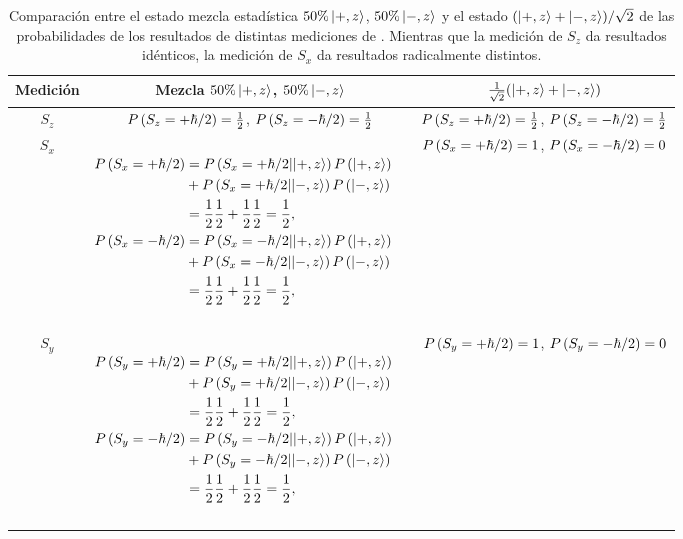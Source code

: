 \documentclass[10pt, a4paper]{article}
\numberwithin{equation}{subsection}
\begin{document}
\begin{table}[ht]
  {\renewcommand{\arraystretch}{2}%
  \begin{tabular}{| c | c | c |}
    \hline
    Medición & Mezcla $50\%\ket{+,z}$, $50\%\ket{-,z}$ &
    $\frac{1}{\sqrt{2}}(\ket{+,z} + \ket{-,z})$ \\
    \hline
    $S_z$ & $P\left({S_z=+\hbar/2}\right) = \frac{1}{2}$, $P\left({S_z=-\hbar/2}\right) =
    \frac{1}{2}$ & $P\left({S_z=+\hbar/2}\right) = \frac{1}{2}$, $P\left({S_z=-\hbar/2}\right) =
    \frac{1}{2}$ \\
    \hline
    $S_x$ & {$\begin{aligned}\;\\ P\left({S_x=+\hbar/2}\right) &=
      P\left({S_x=+\hbar/2}\middle|{\ket{+,z}}\right)P\left({\ket{+,z}}\right) \\ &+
      P\left({S_x=+\hbar/2}\middle|{\ket{-,z}}\right)P\left({\ket{-,z}}\right) \\ &=
      \frac{1}{2}\frac{1}{2} + \frac{1}{2}\frac{1}{2} = \frac{1}{2}, \\
      P\left({S_x=-\hbar/2}\right) &= P\left({S_x=-\hbar/2}\middle|{\ket{+,z}}\right)P\left({\ket{+,z}}\right)
      \\ &+ P\left({S_x=-\hbar/2}\middle|{\ket{-,z}}\right)P\left({\ket{-,z}}\right) \\ &=
      \frac{1}{2}\frac{1}{2} + \frac{1}{2}\frac{1}{2} = \frac{1}{2}, \\ \;
    \end{aligned}$} &
    $P\left({S_x=+\hbar/2}\right) = 1$, $P\left({S_x=-\hbar/2}\right) = 0$ \\
    \hline
    $S_y$ & {$\begin{aligned}\;\\ P\left({S_y=+\hbar/2}\right) &=
      P\left({S_y=+\hbar/2}\middle|{\ket{+,z}}\right)P\left({\ket{+,z}}\right) \\ &+
      P\left({S_y=+\hbar/2}\middle|{\ket{-,z}}\right)P\left({\ket{-,z}}\right) \\ &=
      \frac{1}{2}\frac{1}{2} + \frac{1}{2}\frac{1}{2} = \frac{1}{2}, \\
      P\left({S_y=-\hbar/2}\right) &= P\left({S_y=-\hbar/2}\middle|{\ket{+,z}}\right)P\left({\ket{+,z}}\right)
      \\ &+ P\left({S_y=-\hbar/2}\middle|{\ket{-,z}}\right)P\left({\ket{-,z}}\right) \\
      &= \frac{1}{2}\frac{1}{2} + \frac{1}{2}\frac{1}{2} = \frac{1}{2}, \\ \;
    \end{aligned}$} &
    $P\left({S_y=+\hbar/2}\right) = 1$, $P\left({S_y=-\hbar/2}\right) = 0$ \\
    \hline
  \end{tabular}}
  \caption{Comparación entre el estado mezcla estadística $50\%\ket{+,z}$,
  $50\%\ket{-,z}$ y el estado $(\ket{+,z} + \ket{-,z})/\sqrt{2}$ de las
  probabilidades de los resultados de distintas mediciones de \spin. Mientras
  que la medición de $S_z$ da resultados idénticos, la medición de $S_x$ da
  resultados radicalmente distintos.}
  \label{tab:compmezclasup}
\end{table}
\end{document}

